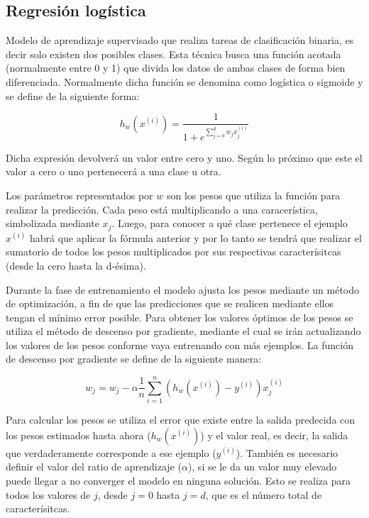 \documentclass[a4paper, 12pt]{book}
\begin{document}
\subsection{Regresión logística}
\label{subsec:regresion_logistica}

Modelo de aprendizaje supervisado que realiza tareas de clasificación binaria, es decir solo existen dos posibles clases. Esta técnica busca una función acotada (normalmente entre 0 y 1) que divida los datos de ambas clases de forma bien diferenciada. Normalmente dicha función se denomina como logística o sigmoide y se define de la siguiente forma:

\begin{equation}
    h_w(x^{(i)}) = \frac{1}{1 + e^{\sum_{j=0}^{d} w_j x_j^{(i)} }}
\end{equation}

Dicha expresión devolverá un valor entre cero y uno. Según lo próximo que este el valor a cero o uno pertenecerá a una clase u otra. 

Los parámetros representados por $w$ son los pesos que utiliza la función para realizar la predicción. Cada peso está multiplicando a una caracerística, simbolizada mediante $x_j$. Luego, para conocer a qué clase pertenece el ejemplo $x^{(i)}$ habrá que aplicar la fórmula anterior y por lo tanto se tendrá que realizar el sumatorio de todos los pesos multiplicados por sus respectivas caracterísitcas (desde la cero hasta la d-ésima). 

Durante la fase de entrenamiento el modelo ajusta los pesos mediante un método de optimización, a fin de que las predicciones que se realicen mediante ellos tengan el mínimo error posible. Para obtener los valores óptimos de los pesos se utiliza el método de descenso por gradiente, mediante el cual se irán actualizando los valores de los pesos conforme vaya entrenando con más ejemplos. La función de descenso por gradiente se define de la siguiente manera:

\begin{equation}
    w_j = w_j - \alpha \frac{1}{n} \sum_{i= 1}^{n} (h_w(x^{(i)}) - y^{(i)}) x_j^{(i)}
\end{equation}

Para calcular los pesos se utiliza el error que existe entre la salida predecida con los pesos estimados hasta ahora ($h_w(x^{(i)})$) y el valor real, es decir, la salida que verdaderamente corresponde a ese ejemplo ($y^{(i)}$). También es necesario definir el valor del ratio de aprendizaje ($\alpha$), si se le da un valor muy elevado puede llegar a no converger el modelo en ninguna solución. Esto se realiza para todos los valores de $j$, desde $j= 0$ hasta $j= d$, que es el número total de caracterísitcas.
\end{document}
